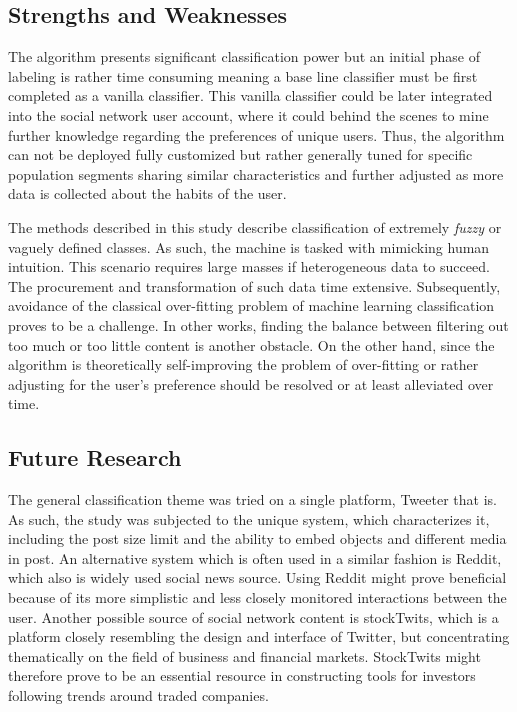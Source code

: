 	\subsection{Strengths and Weaknesses}
		The algorithm presents significant classification power but an initial phase of labeling is rather time consuming meaning a base line classifier must be first completed as a vanilla classifier. This vanilla classifier could be later integrated into the social network user account, where it could behind the scenes to mine further knowledge regarding the preferences of unique users. Thus, the algorithm can not be deployed fully customized but rather generally tuned for specific population segments sharing similar characteristics and further adjusted as more data is collected about the habits of the user. 
		
		\par 
		
		The methods described in this study describe classification of extremely \textit{fuzzy} or vaguely defined classes. As such, the machine is tasked with mimicking human intuition. This scenario requires large masses if heterogeneous data to succeed. The procurement and transformation of such data time extensive. Subsequently, avoidance of the classical over-fitting problem of machine learning classification proves to be a challenge. In other works, finding the balance between filtering out too much or too little content is another obstacle. On the other hand, since the algorithm is theoretically self-improving the problem of over-fitting or rather adjusting for the user's preference should be resolved or at least alleviated over time. 
		
	\subsection{Future Research}
		The general classification theme was tried on a single platform, Tweeter that is. As such, the study was subjected to the unique system, which characterizes it, including the post size limit and the ability to embed objects and different media in post. An alternative system which is often used in a similar fashion is Reddit, which also is widely used social news source. Using Reddit might prove beneficial because of its more simplistic and less closely monitored interactions between the user. Another possible source of social network content is stockTwits, which is a platform closely resembling the design and interface of Twitter, but concentrating thematically on the field of business and financial markets. StockTwits might therefore prove to be an essential resource in constructing tools for investors following trends around traded companies.
		
